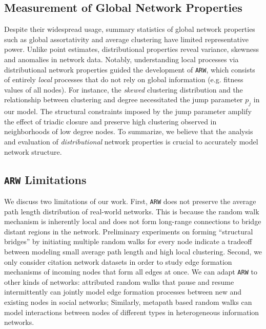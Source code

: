 \subsection{Measurement of Global Network Properties}
Despite their widespread usage, summary statistics of global
network properties such as global assortativity and average clustering have limited representative
power. Unlike point estimates, distributional properties reveal variance, skewness and anomalies
in network data.
Notably, understanding local processes via distributional network properties
guided the development of \texttt{ARW}, which consists of entirely \textit{local} processes
that do not rely on global information (e.g. fitness values of all nodes).
For instance, the \textit{skewed} clustering distribution and the relationship between clustering and
degree necessitated the jump parameter $p_j$ in our model. The structural constraints imposed by the jump
parameter amplify the effect of triadic closure and preserve high clustering
observed in neighborhoods of low degree nodes.
To summarize, we believe that the analysis and evaluation of \textit{distributional}
network properties is crucial to accurately model network structure.


\subsection{\texttt{ARW} Limitations}
We discuss two limitations of our work. First, \texttt{ARW} does not preserve the average
path length distribution of real-world networks. This is because the random walk
mechanism is inherently local and does not form long-range connections to bridge
distant regions in the network. Preliminary experiments on forming ``structural bridges''
by initiating multiple random walks for every node indicate a tradeoff
between modeling small average path length and high local clustering. Second,
we only consider citation network datasets in order to study edge formation mechanisms of
incoming nodes that form all edges at once. We can adapt \texttt{ARW} to other
kinds of networks: attributed random walks that pause and resume intermittently
can jointly model edge formation processes between new and existing nodes in
social networks; Similarly, metapath based random walks can model interactions between
nodes of different types in heterogeneous information networks.

